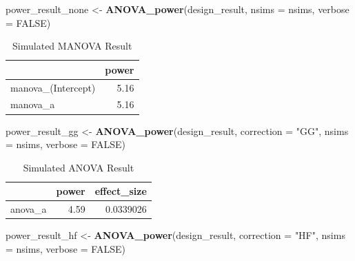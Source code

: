 \documentclass[
]{book}
\newenvironment{Shaded}{\begin{snugshade}}{\end{snugshade}}
\newcommand{\DataTypeTok}[1]{\textcolor[rgb]{0.13,0.29,0.53}{#1}}
\newcommand{\KeywordTok}[1]{\textcolor[rgb]{0.13,0.29,0.53}{\textbf{#1}}}
\newcommand{\NormalTok}[1]{#1}
\newcommand{\OtherTok}[1]{\textcolor[rgb]{0.56,0.35,0.01}{#1}}
\newcommand{\StringTok}[1]{\textcolor[rgb]{0.31,0.60,0.02}{#1}}
\begin{document}
\newpage

\begin{Shaded}
\begin{Highlighting}[]
\NormalTok{power_result_none <-}\StringTok{ }\KeywordTok{ANOVA_power}\NormalTok{(design_result, }\DataTypeTok{nsims =}\NormalTok{ nsims, }\DataTypeTok{verbose =} \OtherTok{FALSE}\NormalTok{)}
\end{Highlighting}
\end{Shaded}

\begin{table}[!h]

\caption{\label{tab:unnamed-chunk-135}Simulated MANOVA Result}
\centering
\begin{tabular}[t]{l|r}
\hline
  & power\\
\hline
manova\_(Intercept) & 5.16\\
\hline
manova\_a & 5.16\\
\hline
\end{tabular}
\end{table}

\begin{Shaded}
\begin{Highlighting}[]
\NormalTok{power_result_gg <-}\StringTok{ }\KeywordTok{ANOVA_power}\NormalTok{(design_result, }\DataTypeTok{correction =} \StringTok{"GG"}\NormalTok{,}
                               \DataTypeTok{nsims =}\NormalTok{ nsims, }\DataTypeTok{verbose =} \OtherTok{FALSE}\NormalTok{)}
\end{Highlighting}
\end{Shaded}

\begin{table}[!h]

\caption{\label{tab:unnamed-chunk-137}Simulated ANOVA Result}
\centering
\begin{tabular}[t]{l|r|r}
\hline
  & power & effect\_size\\
\hline
anova\_a & 4.59 & 0.0339026\\
\hline
\end{tabular}
\end{table}

\begin{Shaded}
\begin{Highlighting}[]
\NormalTok{power_result_hf <-}\StringTok{ }\KeywordTok{ANOVA_power}\NormalTok{(design_result, }\DataTypeTok{correction =} \StringTok{"HF"}\NormalTok{,}
                               \DataTypeTok{nsims =}\NormalTok{ nsims, }\DataTypeTok{verbose =} \OtherTok{FALSE}\NormalTok{)}
\end{Highlighting}
\end{Shaded}
\end{document}
